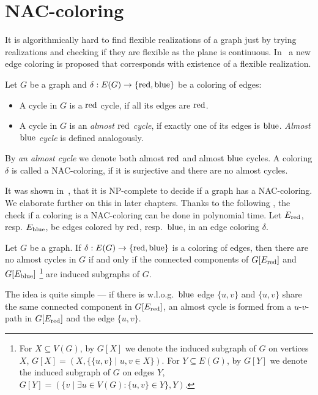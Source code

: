 \section{NAC-coloring}

It is algorithmically hard to find flexible realizations of a graph
just by trying realizations and checking if they are flexible
as the plane is continuous.
In~\cite{legersky_original} a new edge coloring is proposed
that corresponds with existence of a flexible realization.

\begin{definition}
	Let \( G \) be a graph and \( \delta: E(G) \to \{ \text{red}, \text{blue} \} \)
	be a coloring of edges:
	\begin{itemize}
		\item A cycle in \( G \) is a \( \text{red} \) cycle, if all its edges are \( \text{red} \).
		\item A cycle in \( G \) is an \emph{almost \( \text{red} \) cycle},
		      if exactly one of its edges is \( \text{blue} \).
		      \emph{Almost \( \text{blue} \) cycle} is defined analogously.
	\end{itemize}
	By \emph{an almost cycle} we denote both almost \( \text{red} \) and almost \( \text{blue} \) cycles.
	A coloring \( \delta \) is called a NAC-coloring, if it is surjective
	and there are no almost cycles.
\end{definition}
%

It was shown in~\cite{np_complete}, that it is NP-complete to decide if a graph has a NAC-coloring.
We elaborate further on this in later chapters.
Thanks to the following ,
the check if a coloring is a NAC-coloring can be done in polynomial time.
Let \( E_{\text{red}}\), resp. \( E_{\text{blue}} \), be edges colored by \( \text{red} \), resp.~\( \text{blue} \),
in an edge coloring \( \delta \).
%
\begin{lemma}%
	\label{lemma:is_nac_coloring}
	Let \( G \) be a graph. If \( \delta: E(G) \to \{ \text{red}, \text{blue} \} \) is a coloring of edges,
	then there are no almost cycles in \( G \) if and only if the connected components
	of \( G[E_{\text{red}}] \) and \( G[E_{\text{blue}}] \)%
	\footnote{
		For \(X \subseteq V(G)\), by \(G[X]\) we denote
		the induced subgraph of \( G \) on vertices \( X \),
		\( G[X] = (X, \{ \{u, v\} \mid u, v \in X\}) \).
		For \(Y \subseteq E(G)\), by \(G[Y]\) we denote
		the induced subgraph of \( G \) on edges \( Y \),
		\( G[Y] = (\{ v \mid \exists u \in V(G) : \{u, v\} \in Y\}, Y) \).
	}
	are induced subgraphs of \( G \).
\end{lemma}
%
The idea is quite simple --- if there is w.l.o.g.\ \( \text{blue} \) edge \( \{u, v\} \)
and \( \{u, v\} \) share the same connected component in \( G[E_{\text{red}}] \),
an almost cycle is formed from a \( u \)-\( v \)-path in \( G[E_{\text{red}}] \)
and the edge \( \{u, v\} \).

